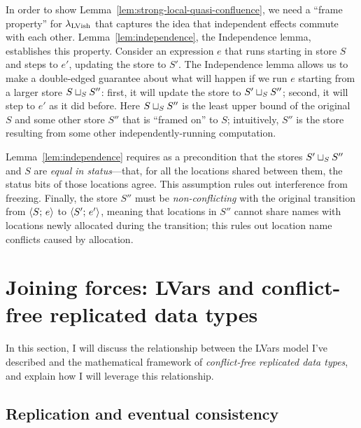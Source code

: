 \documentclass{article}
\begin{document}
\LemStrongLocalQuasiConfluence

\noindent In order to show
Lemma~\ref{lem:strong-local-quasi-confluence}, we need a ``frame
property'' for $\lambda_{\textrm{LVish}}$ that captures the idea that independent
effects commute with each other.  Lemma~\ref{lem:independence}, the
Independence lemma, establishes this property.  Consider an expression
$e$ that runs starting in store $S$ and steps to $e'$, updating the
store to $S'$.  The Independence lemma allows us to make a
double-edged guarantee about what will happen if we run $e$ starting
from a larger store $S \sqcup_{S} S''$: first, it will update the
store to $S' \sqcup_{S} S''$; second, it will step to $e'$ as it did
before.  Here $S \sqcup_{S} S''$ is the least upper bound of the
original $S$ and some other store $S''$ that is ``framed on'' to $S$;
intuitively, $S''$ is the store resulting from some other
independently-running computation.

\LemIndependence

\noindent Lemma~\ref{lem:independence} requires as a precondition that
the stores $S' \sqcup_{S} S''$ and $S$ are \emph{equal in
  status}---that, for all the locations shared between them, the
status bits of those locations agree.  This assumption rules out
interference from freezing.  Finally, the store $S''$ must be
\emph{non-conflicting} with the original transition from
$\langle S;\, e \rangle$ to $\langle S';\, e' \rangle$, meaning that locations in $S''$
cannot share names with locations newly allocated during the
transition; this rules out location name conflicts caused by
allocation.

\DefEqualStatus

\DefNonConflicting

\section{Joining forces: LVars and conflict-free replicated data types}\label{s:crdts}

In this section, I will discuss the relationship between the LVars
model I've described and the mathematical framework of
\emph{conflict-free replicated data types}, and explain how I will
leverage this relationship.

\subsection{Replication and eventual consistency}
\end{document}
